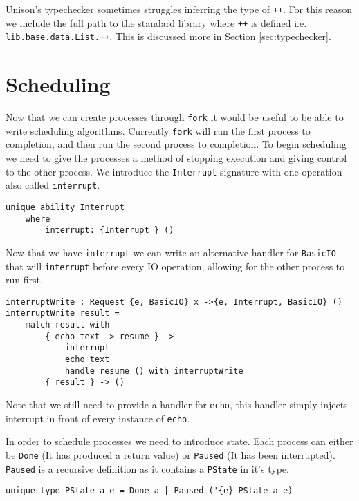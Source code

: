 \documentclass[logo,bsc,singlespacing,parskip]{infthesis}
\begin{document}
Unison's typechecker sometimes struggles inferring the type of \texttt{++}. For
this reason we include the full path to the standard library where \texttt{++}
is defined i.e. \texttt{lib.base.data.List.++}. This is discussed more in
Section \ref{sec:typechecker}.

\section{Scheduling}

Now that we can create processes through \texttt{fork} it would be useful to be able to write scheduling algorithms. Currently \texttt{fork} will run the first process to completion, and then run the second process to completion. To begin scheduling we need to give the processes a method of stopping execution and giving control to the other process. We introduce the \texttt{Interrupt} signature with one operation also called \texttt{interrupt}.

\begin{lstlisting}[language=unison]
unique ability Interrupt
    where
        interrupt: {Interrupt } ()
\end{lstlisting}

Now that we have \texttt{interrupt} we can write an alternative handler for
\texttt{BasicIO} that will \texttt{interrupt} before every IO operation,
allowing for the other process to run first.

\begin{lstlisting}[language=unison]
interruptWrite : Request {e, BasicIO} x ->{e, Interrupt, BasicIO} ()
interruptWrite result =
    match result with
        { echo text -> resume } -> 
            interrupt
            echo text 
            handle resume () with interruptWrite
        { result } -> ()
\end{lstlisting}

Note that we still need to provide a handler for \texttt{echo}, this handler
simply injects interrupt in front of every instance of \texttt{echo}.

In order to schedule processes we need to introduce state. Each process can either be \texttt{Done} (It has produced a return value) or \texttt{Paused} (It has been interrupted). \texttt{Paused} is a recursive definition as it contains a \texttt{PState} in it's type.

\begin{lstlisting}[language=unison]
unique type PState a e = Done a | Paused ('{e} PState a e)
\end{lstlisting}
\end{document}
